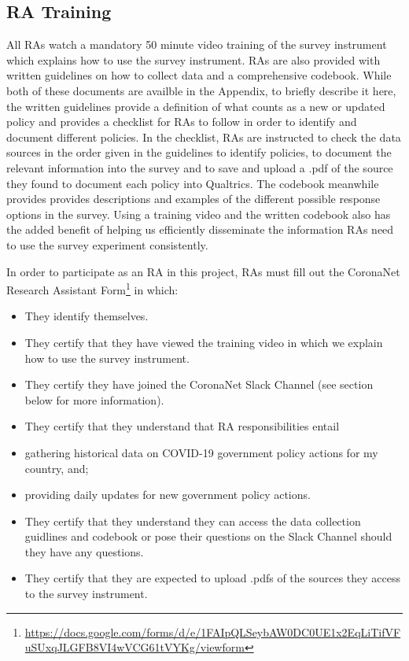 \documentclass[]{article}
\providecommand{\tightlist}{%
  \setlength{\itemsep}{0pt}\setlength{\parskip}{0pt}}
\let\rmarkdownfootnote\footnote%
\def\footnote{\protect\rmarkdownfootnote}
\begin{document}
\hypertarget{ra-training}{%
\subsection{RA Training}\label{ra-training}}

All RAs watch a mandatory 50 minute video training of the survey instrument which explains how to use the survey instrument. RAs are also provided with written guidelines on how to collect data and a comprehensive codebook. While both of these documents are availble in the Appendix, to briefly describe it here, the written guidelines provide a definition of what counts as a new or updated policy and provides a checklist for RAs to follow in order to identify and document different policies. In the checklist, RAs are instructed to check the data sources in the order given in the guidelines to identify policies, to document the relevant information into the survey and to save and upload a .pdf of the source they found to document each policy into Qualtrics. The codebook meanwhile provides provides descriptions and examples of the different possible response options in the survey. Using a training video and the written codebook also has the added benefit of helping us efficiently disseminate the information RAs need to use the survey experiment consistently.

In order to participate as an RA in this project, RAs must fill out the CoronaNet Research Assistant Form\footnote{\url{https://docs.google.com/forms/d/e/1FAIpQLSeybAW0DC0UE1x2EqLiTifVFuSUxqJLGFB8VI4wVCG61tVYKg/viewform}} in which:

\begin{itemize}
\tightlist
\item
  They identify themselves.
\item
  They certify that they have viewed the training video in which we explain how to use the survey instrument.
\item
  They certify they have joined the CoronaNet Slack Channel (see section below for more information).
\item
  They certify that they understand that RA responsibilities entail
\item
  gathering historical data on COVID-19 government policy actions for my country, and;
\item
  providing daily updates for new government policy actions.
\item
  They certify that they understand they can access the data collection guidlines and codebook or pose their questions on the Slack Channel should they have any questions.
\item
  They certify that they are expected to upload .pdfs of the sources they access to the survey instrument.
\end{itemize}
\end{document}
